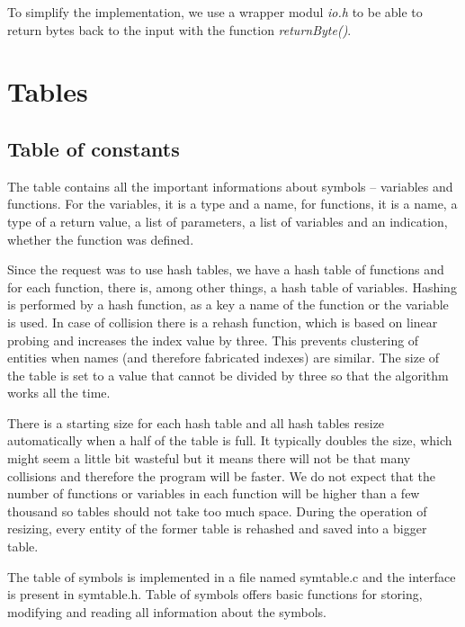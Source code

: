 \documentclass[10pt,a4paper,titlepage]{article}
\begin{document}
\begin{justify}

To simplify the implementation, we use a wrapper modul \textit{io.h} to
be able to return bytes back to the input with the function \textit{returnByte()}.
\end{justify}

\newpage
\section{Tables}
\subsection{Table of constants}

\begin{justify}

The table contains all the important informations about symbols – variables and
functions. For the variables, it is a type and a name, for functions, it is a name,
a type of a return value, a list of parameters, a list of variables and an
indication, whether the function was defined.

Since the request was to use hash tables, we have a hash table of
functions and for each function, there is, among other things, a hash table of
variables. Hashing is performed by a hash function, as a key a name of the
function or the variable is used. In case of collision there is a rehash
function, which is based on linear probing and increases the index value
by three. This prevents clustering of entities when names (and therefore
fabricated indexes) are similar. The size of the table is set to a value
that cannot be divided by three so that the algorithm works all the time.

There is a starting size for each hash table and all hash tables resize
automatically when a half of the table is full. It typically doubles the size,
which might seem a little bit wasteful but it means there will not be that many
collisions and therefore the program will be faster. We do not expect that the
number of functions or variables in each function will be higher than a few
thousand so tables should not take too much space. During the operation of
resizing, every entity of the former table is rehashed and saved into a bigger
table.

The table of symbols is implemented in a file named symtable.c and the
interface is present in symtable.h. Table of symbols offers basic functions
for storing, modifying and reading all information about the symbols.

\end{justify}
\end{document}
